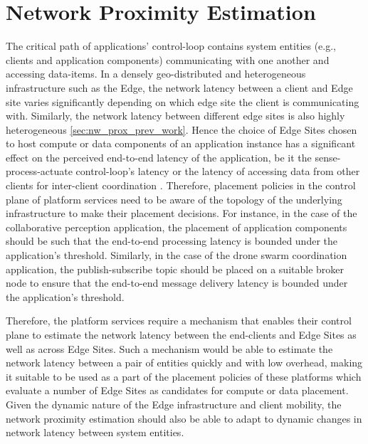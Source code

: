 \section{Network Proximity Estimation}
The critical path of applications' control-loop contains system entities (e.g., clients and application components) communicating with one another and accessing data-items. In a densely geo-distributed and heterogeneous infrastructure such as the Edge, the network latency between a client and Edge site varies significantly depending on which edge site the client is communicating with. Similarly, the network latency between different edge sites is also highly heterogeneous \cref{sec:nw_prox_prev_work}. Hence the choice of Edge Sites chosen to host compute or data components of an application instance has a significant effect on the perceived end-to-end latency of the application, be it the sense-process-actuate control-loop's latency or the latency of accessing data from other clients for inter-client coordination \cite{sarkar2016theoretical,amarasinghe2018data,naas2017ifogstor,liu2019mobility}. Therefore, placement policies in the control plane of platform services need to be aware of the topology of the underlying infrastructure to make their placement decisions. For instance, in the case of the collaborative perception application, the placement of application components should be such that the end-to-end processing latency is bounded under the application's  threshold. Similarly, in the case of the drone swarm coordination application, the publish-subscribe topic should be placed on a suitable broker node to ensure that the end-to-end message delivery latency is bounded under the application's threshold.  
\par Therefore, the platform services require a mechanism that enables their control plane to estimate the network latency between the end-clients and Edge Sites as well as across Edge Sites. Such a mechanism would be able to estimate the network latency between a pair of entities quickly and with low overhead, making it suitable to be used as a part of the placement policies of these platforms which evaluate a number of Edge Sites as candidates for compute or data placement. Given the dynamic nature of the Edge infrastructure and client mobility, the network proximity estimation should also be able to adapt to dynamic changes in network latency between system entities.

